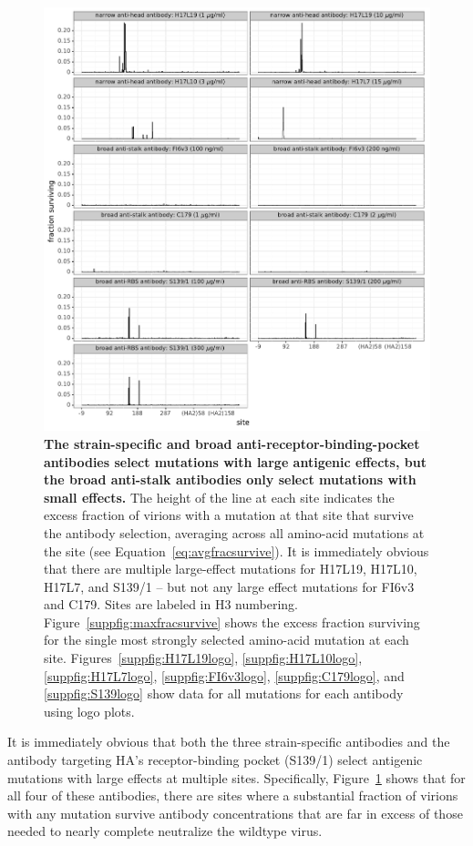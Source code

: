 \documentclass[11pt]{article}
\begin{document}
\begin{figure}
\centerline{\includegraphics[width=\textwidth]{figs/avgfracsurvive.pdf}}
\caption{
\label{fig:avgfracsurvive}
{\bf The strain-specific and broad anti-receptor-binding-pocket antibodies select mutations with large antigenic effects, but the broad anti-stalk antibodies only select mutations with small effects.}
The height of the line at each site indicates the excess fraction of virions with a mutation at that site that survive the antibody selection, averaging across all amino-acid mutations at the site (see Equation~\ref{eq:avgfracsurvive}).
It is immediately obvious that there are multiple large-effect mutations for H17L19, H17L10, H17L7, and S139/1 -- but not any large effect mutations for FI6v3 and C179.
Sites are labeled in H3 numbering.
Figure~\ref{suppfig:maxfracsurvive} shows the excess fraction surviving for the single most strongly selected amino-acid mutation at each site.
Figures~\ref{suppfig:H17L19logo}, \ref{suppfig:H17L10logo}, \ref{suppfig:H17L7logo}, \ref{suppfig:FI6v3logo}, \ref{suppfig:C179logo}, and \ref{suppfig:S139logo} show data for all mutations for each antibody using logo plots.
}
\end{figure}

It is immediately obvious that both the three strain-specific antibodies and the antibody targeting HA's receptor-binding pocket (S139/1) select antigenic mutations with large effects at multiple sites.
Specifically, Figure~\ref{fig:avgfracsurvive} shows that for all four of these antibodies, there are sites where a substantial fraction of virions with any mutation survive antibody concentrations that are far in excess of those needed to nearly complete neutralize the wildtype virus.
\end{document}
